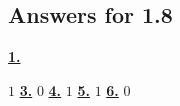 \subsection *{Answers for 1.8}
\hypertarget {a:1.8.1}{\hyperlink {e:1.8.1}{\bfseries 1.}} \mdseries $1$\qquad 
\hypertarget {a:1.8.3}{\hyperlink {e:1.8.3}{\bfseries 3.}} \mdseries $0$\qquad 
\hypertarget {a:1.8.4}{\hyperlink {e:1.8.4}{\bfseries 4.}} \mdseries $1$\qquad 
\hypertarget {a:1.8.5}{\hyperlink {e:1.8.5}{\bfseries 5.}} \mdseries $1$\qquad 
\hypertarget {a:1.8.6}{\hyperlink {e:1.8.6}{\bfseries 6.}} \mdseries $0$\qquad 
